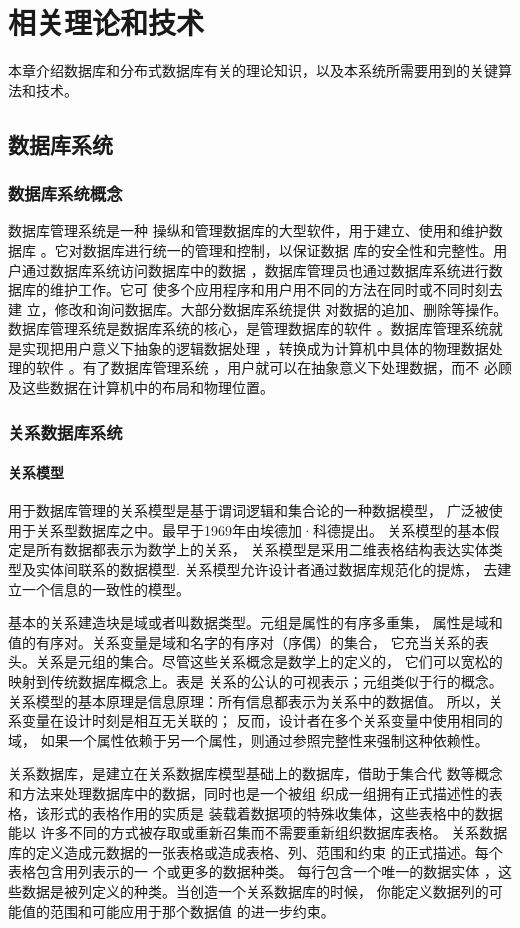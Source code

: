 
\chapter{相关理论和技术}
本章介绍数据库和分布式数据库有关的理论知识，以及本系统所需要用到的关键算法和技术。
\section{数据库系统}
\subsection{数据库系统概念}
数据库管理系统是一种
操纵和管理数据库的大型软件，用于建立、使用和维护数据库
。它对数据库进行统一的管理和控制，以保证数据
库的安全性和完整性。用户通过数据库系统访问数据库中的数据
，数据库管理员也通过数据库系统进行数据库的维护工作。它可
使多个应用程序和用户用不同的方法在同时或不同时刻去建
立，修改和询问数据库。大部分数据库系统提供
对数据的追加、删除等操作。
数据库管理系统是数据库系统的核心，是管理数据库的软件
。数据库管理系统就是实现把用户意义下抽象的逻辑数据处理
，转换成为计算机中具体的物理数据处理的软件
。有了数据库管理系统
，用户就可以在抽象意义下处理数据，而不
必顾及这些数据在计算机中的布局和物理位置。
\subsection{关系数据库系统}
\subsubsection{关系模型}
用于数据库管理的关系模型是基于谓词逻辑和集合论的一种数据模型，
广泛被使用于关系型数据库之中。最早于1969年由埃德加·科德提出。
关系模型的基本假定是所有数据都表示为数学上的关系，
关系模型是采用二维表格结构表达实体类型及实体间联系的数据模型.
关系模型允许设计者通过数据库规范化的提炼，
去建立一个信息的一致性的模型。

基本的关系建造块是域或者叫数据类型。元组是属性的有序多重集，
属性是域和值的有序对。关系变量是域和名字的有序对（序偶）的集合，
它充当关系的表头。关系是元组的集合。尽管这些关系概念是数学上的定义的，
它们可以宽松的映射到传统数据库概念上。表是
关系的公认的可视表示；元组类似于行的概念。
关系模型的基本原理是信息原理：所有信息都表示为关系中的数据值。
所以，关系变量在设计时刻是相互无关联的；
反而，设计者在多个关系变量中使用相同的域，
如果一个属性依赖于另一个属性，则通过参照完整性来强制这种依赖性。

关系数据库，是建立在关系数据库模型基础上的数据库，借助于集合代
数等概念和方法来处理数据库中的数据，同时也是一个被组
织成一组拥有正式描述性的表格，该形式的表格作用的实质是
装载着数据项的特殊收集体，这些表格中的数据能以
许多不同的方式被存取或重新召集而不需要重新组织数据库表格。
关系数据库的定义造成元数据的一张表格或造成表格、列、范围和约束
的正式描述。每个表格包含用列表示的一
个或更多的数据种类。 每行包含一个唯一的数据实体
，这些数据是被列定义的种类。当创造一个关系数据库的时候，
你能定义数据列的可能值的范围和可能应用于那个数据值
的进一步约束。
